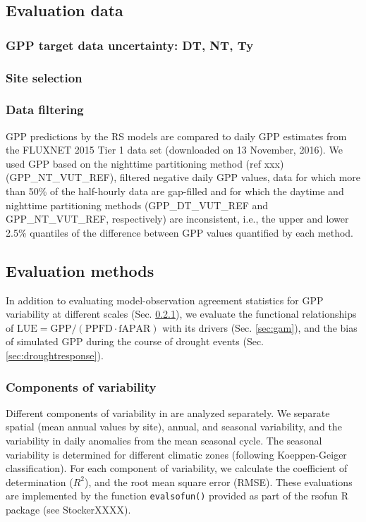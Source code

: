 \documentclass{myreport}
\begin{document}
\subsection{Evaluation data}

\subsubsection{GPP target data uncertainty: DT, NT, Ty}
\label{sec:gppdata}

\subsubsection{Site selection}
\label{sec:sites}

\subsubsection{Data filtering}
\label{sec:datafiltering}
GPP predictions by the RS models are compared to daily GPP estimates from the FLUXNET 2015 Tier 1 data set (downloaded on 13 November, 2016). We used GPP based on the nighttime partitioning method (ref xxx) (GPP_NT_VUT_REF), filtered negative daily GPP values, data for which more than 50\% of the half-hourly data are gap-filled and for which the daytime and nighttime partitioning methods (GPP_DT_VUT_REF and GPP_NT_VUT_REF, respectively) are inconsistent, i.e., the upper and lower 2.5\% quantiles of the difference between GPP values quantified by each method.

\subsection{Evaluation methods}

In addition to evaluating model-observation agreement statistics for GPP variability at different scales (Sec. \ref{sec:evalmethod_variability}), we evaluate the functional relationships of $\text{LUE} = \text{GPP} / (\text{PPFD} \cdot \text{fAPAR})$ with its drivers (Sec. \ref{sec:gam}), and the bias of simulated GPP during the course of drought events (Sec. \ref{sec:droughtresponse}).

\subsubsection{Components of variability}
\label{sec:evalmethod_variability}
Different components of variability in are analyzed separately. We separate spatial (mean annual values by site), annual, and seasonal variability, and the variability in daily anomalies from the mean seasonal cycle. The seasonal variability is determined for different climatic zones (following Koeppen-Geiger classification). For each component of variability, we calculate the coefficient of determination ($R^2$), and the root mean square error (RMSE). These evaluations are implemented by the function \texttt{eval\textunderscore sofun()} provided as part of the rsofun R package (see StockerXXXX).
\end{document}
